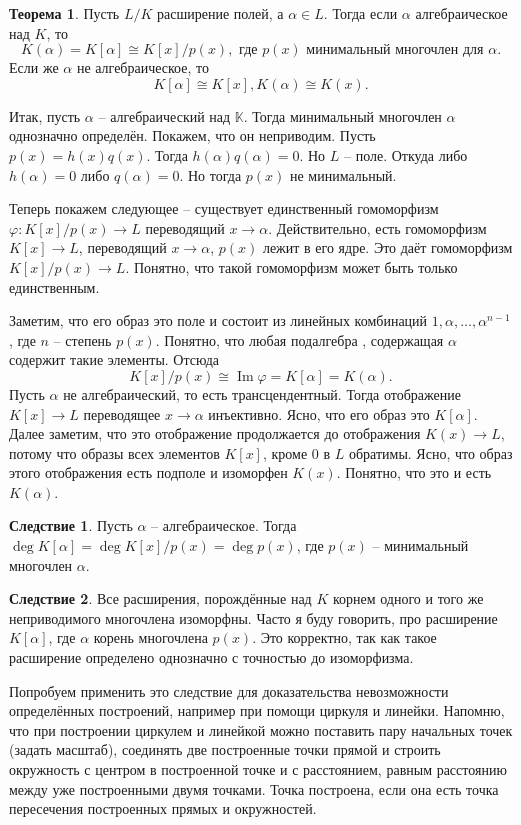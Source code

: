 \documentclass[10pt,a4paper,oneside]{book}
\theoremstyle{definition}
\newtheorem{thm}{{\color{red!40!black} Теорема}}
\newtheorem{cor}{Следствие}
\newcommand{\mb}[1]{\mathbb{#1}}
\newcommand{\im}{\operatorname{Im}}
\def\ffi{\varphi}
\def\thrm{\begin{thm}}
\def\ethrm{\end{thm}}
\def\crl{\begin{cor}}
\def\ecrl{\end{cor}}
\begin{document}
\thrm Пусть $L/K$ расширение полей, а $\alpha \in L$. Тогда если $\alpha$ алгебраическое над $K$, то $$K(\alpha)=K[\alpha]\cong K[x]/p(x),  \text{ где $p(x)$ минимальный многочлен для $\alpha$}.$$
Если же $\alpha$ не алгебраическое, то $$K[\alpha]\cong K[x], K(\alpha) \cong K(x).$$
\ethrm
\proof Итак, пусть $\alpha$ -- алгебраический над $\mb K$. Тогда минимальный многочлен $\alpha$ однозначно определён. Покажем, что он неприводим. Пусть $p(x)=h(x)q(x)$. Тогда $h(\alpha)q(\alpha)=0$. Но $L$ -- поле. Откуда либо $h(\alpha)=0$ либо $q(\alpha)=0$. Но тогда $p(x)$ не минимальный.

Теперь покажем следующее -- существует единственный гомоморфизм $\ffi \colon K[x]/p(x) \to L$ переводящий $x \to \alpha$. Действительно, есть гомоморфизм $K[x]\to L$, переводящий $x\to \alpha$, $p(x)$ лежит в его ядре. Это даёт гомоморфизм $K[x]/p(x) \to L$. 
Понятно, что такой гомоморфизм может быть только единственным.

Заметим, что его образ это поле и состоит из линейных комбинаций $1,\alpha,\dots,\alpha^{n-1}$, где $n$ -- степень $p(x)$. Понятно, что любая подалгебра , содержащая $\alpha$ содержит такие элементы. Отсюда $$K[x]/p(x) \cong \im \ffi = K[\alpha]=K(\alpha).$$
Пусть $\alpha$ не алгебраический, то есть трансцендентный. Тогда отображение $K[x] \to L$ переводящее $x\to\alpha$ инъективно. Ясно, что его образ это $K[\alpha]$. Далее заметим, что это отображение продолжается до отображения $K(x) \to L$, потому что образы всех элементов $K[x]$, кроме 0 в $L$ обратимы. Ясно, что образ этого отображения есть подполе и изоморфен $K(x)$. Понятно, что это и есть $K(\alpha)$.   
\endproof

\crl Пусть $\alpha$ -- алгебраическое. Тогда $\deg K[\alpha]= \deg K[x]/p(x)= \deg p(x)$, где $p(x)$ -- минимальный многочлен $\alpha$.
\ecrl

\crl Все расширения, порождённые над $K$ корнем одного и того же неприводимого многочлена изоморфны. Часто я буду говорить, про расширение $K[\alpha]$, где $\alpha$ корень многочлена $p(x)$. Это корректно, так как такое расширение определено однозначно с точностью до изоморфизма.
\ecrl

Попробуем применить это следствие для доказательства невозможности определённых  построений, например при помощи циркуля и линейки. Напомню, что при построении циркулем и линейкой можно поставить пару начальных точек (задать масштаб), соединять две построенные  точки прямой и строить окружность с центром в построенной точке и с расстоянием, равным расстоянию между уже построенными двумя точками. Точка построена, если она есть точка пересечения построенных прямых и окружностей. 
\end{document}
